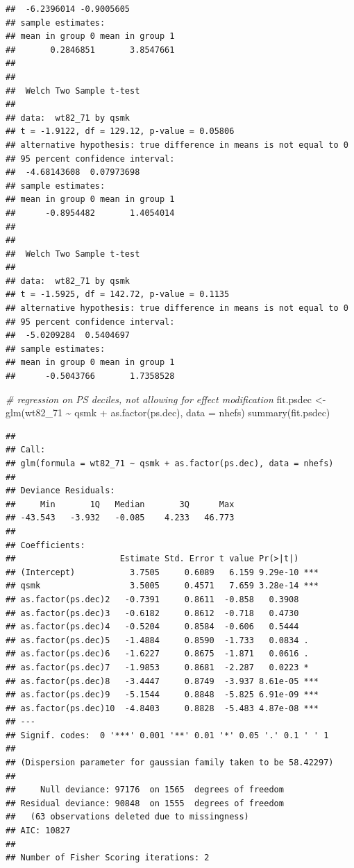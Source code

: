 \documentclass[
  10pt,
]{book}
\newenvironment{Shaded}{\begin{snugshade}}{\end{snugshade}}
\newcommand{\AttributeTok}[1]{\textcolor[rgb]{0.77,0.63,0.00}{#1}}
\newcommand{\CommentTok}[1]{\textcolor[rgb]{0.56,0.35,0.01}{\textit{#1}}}
\newcommand{\FunctionTok}[1]{\textcolor[rgb]{0.00,0.00,0.00}{#1}}
\newcommand{\NormalTok}[1]{#1}
\newcommand{\OtherTok}[1]{\textcolor[rgb]{0.56,0.35,0.01}{#1}}
\newcommand{\SpecialCharTok}[1]{\textcolor[rgb]{0.00,0.00,0.00}{#1}}
\begin{document}
\begin{verbatim}
##  -6.2396014 -0.9005605
## sample estimates:
## mean in group 0 mean in group 1 
##       0.2846851       3.8547661 
## 
## 
##  Welch Two Sample t-test
## 
## data:  wt82_71 by qsmk
## t = -1.9122, df = 129.12, p-value = 0.05806
## alternative hypothesis: true difference in means is not equal to 0
## 95 percent confidence interval:
##  -4.68143608  0.07973698
## sample estimates:
## mean in group 0 mean in group 1 
##      -0.8954482       1.4054014 
## 
## 
##  Welch Two Sample t-test
## 
## data:  wt82_71 by qsmk
## t = -1.5925, df = 142.72, p-value = 0.1135
## alternative hypothesis: true difference in means is not equal to 0
## 95 percent confidence interval:
##  -5.0209284  0.5404697
## sample estimates:
## mean in group 0 mean in group 1 
##      -0.5043766       1.7358528
\end{verbatim}

\begin{Shaded}
\begin{Highlighting}[]
\CommentTok{\# regression on PS deciles, not allowing for effect modification}
\NormalTok{fit.psdec }\OtherTok{\textless{}{-}} \FunctionTok{glm}\NormalTok{(wt82\_71 }\SpecialCharTok{\textasciitilde{}}\NormalTok{ qsmk }\SpecialCharTok{+} \FunctionTok{as.factor}\NormalTok{(ps.dec), }\AttributeTok{data =}\NormalTok{ nhefs)}
\FunctionTok{summary}\NormalTok{(fit.psdec)}
\end{Highlighting}
\end{Shaded}

\begin{verbatim}
## 
## Call:
## glm(formula = wt82_71 ~ qsmk + as.factor(ps.dec), data = nhefs)
## 
## Deviance Residuals: 
##     Min       1Q   Median       3Q      Max  
## -43.543   -3.932   -0.085    4.233   46.773  
## 
## Coefficients:
##                     Estimate Std. Error t value Pr(>|t|)    
## (Intercept)           3.7505     0.6089   6.159 9.29e-10 ***
## qsmk                  3.5005     0.4571   7.659 3.28e-14 ***
## as.factor(ps.dec)2   -0.7391     0.8611  -0.858   0.3908    
## as.factor(ps.dec)3   -0.6182     0.8612  -0.718   0.4730    
## as.factor(ps.dec)4   -0.5204     0.8584  -0.606   0.5444    
## as.factor(ps.dec)5   -1.4884     0.8590  -1.733   0.0834 .  
## as.factor(ps.dec)6   -1.6227     0.8675  -1.871   0.0616 .  
## as.factor(ps.dec)7   -1.9853     0.8681  -2.287   0.0223 *  
## as.factor(ps.dec)8   -3.4447     0.8749  -3.937 8.61e-05 ***
## as.factor(ps.dec)9   -5.1544     0.8848  -5.825 6.91e-09 ***
## as.factor(ps.dec)10  -4.8403     0.8828  -5.483 4.87e-08 ***
## ---
## Signif. codes:  0 '***' 0.001 '**' 0.01 '*' 0.05 '.' 0.1 ' ' 1
## 
## (Dispersion parameter for gaussian family taken to be 58.42297)
## 
##     Null deviance: 97176  on 1565  degrees of freedom
## Residual deviance: 90848  on 1555  degrees of freedom
##   (63 observations deleted due to missingness)
## AIC: 10827
## 
## Number of Fisher Scoring iterations: 2
\end{verbatim}
\end{document}
